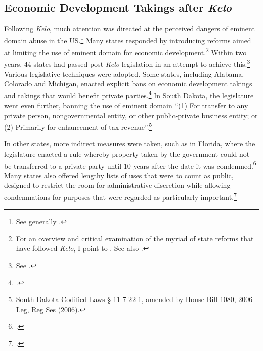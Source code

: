 \subsection{Economic Development Takings after {\it Kelo}}\label{sec:postkelo}

Following {\it Kelo}, much attention was directed at the perceived dangers of eminent domain abuse in the US.\footnote{See generally \cite{somin09}.} %
Many states responded by introducing reforms aimed at limiting the use of eminent domain for economic development.\footnote{For an overview and critical examination of the myriad of state reforms that have followed {\it Kelo}, I point to \cite{eagle08}. See also \cite{somin09}.} Within two years, 44 states had passed post-{\it Kelo} legislation in an attempt to achieve this.\footnote{See \cite{castle}.} Various legislative techniques were adopted. Some states, including Alabama, Colorado and Michigan, enacted explicit bans on economic development takings and takings that would benefit private parties.\footcite[See][107-108]{eagle08} In South Dakota, the legislature went even further, banning the use of eminent domain ``(1) For transfer to any private person, nongovernmental entity, or other public-private business entity; or (2) Primarily for enhancement of tax revenue''.\footnote{South Dakota Codified Laws § 11-7-22-1, amended by House Bill 1080, 2006 Leg, Reg Ses (2006).}

In other states, more indirect measures were taken, such as in Florida, where the legislature enacted a rule whereby property taken by the government could not be transferred to a private party until 10 years after the date it was condemned.\footcite[809]{eagle08} Many states also offered lengthy lists of uses that were to count as public, designed to restrict the room for administrative discretion while allowing condemnations for purposes that were regarded as particularly important.\footcite[804]{eagle08}

